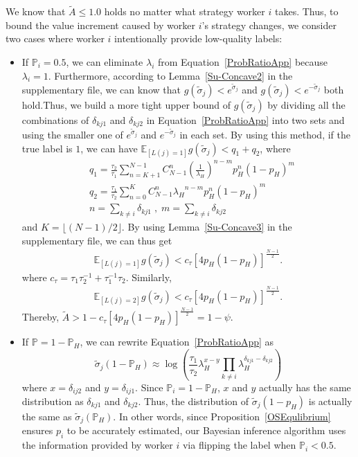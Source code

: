 We know that $\tilde{A}\leq 1.0$ holds no matter what strategy worker $i$ takes. Thus, to bound the value increment caused by worker $i$'s strategy changes, we consider two cases where worker $i$ intentionally provide low-quality labels:
\begin{itemize}
\item If $\mathbb{P}_i=0.5$, we can eliminate $\lambda_i$ from Equation~\ref{ProbRatioApp} because $\lambda_i=1$. Furthermore, according to Lemma~\ref{Su-Concave2} in the supplementary file, we can know that 
$g(\tilde{\sigma}_j)< e^{\tilde{\sigma}_j}$ and $g(\tilde{\sigma}_j)< e^{-\tilde{\sigma}_j}$ both hold.Thus, we build a more tight upper bound of $g(\tilde{\sigma}_j)$ by dividing all the combinations of $\delta_{kj1}$ and $\delta_{kj2}$ in Equation~\ref{ProbRatioApp} into two sets and using the smaller one of $e^{\tilde{\sigma}_j}$ and $e^{-\tilde{\sigma}_j}$ in each set.
By using this method, if the true label is $1$, we can have $\mathbb{E}_{[L(j)=1]}g(\tilde{\sigma}_j)< q_1+q_2$, where
\begin{equation*}
\begin{split}
&q_1 = \frac{\tau_2}{\tau_1}{\sum}_{n=K+1}^{N-1}C_{N-1}^{n} (\frac{1}{\lambda_H})^{n-m}p_H^n(1-p_H)^m\\
&q_2 = \frac{\tau_1}{\tau_2}{\sum}_{n=0}^{K}C_{N-1}^{n} {\lambda_H}^{n-m}p_H^n(1-p_H)^m\\
&n={\sum}_{k\neq i}\delta_{kj1}\;,\;m= {\sum}_{k\neq i}\delta_{kj2}
\end{split}
\end{equation*}
and $K=\lfloor (N-1)/2 \rfloor$. By using Lemma~\ref{Su-Concave3} in the supplementary file, we can thus get
\begin{equation*}
\begin{split}
\mathbb{E}_{[L(j)=1]}g(\tilde{\sigma}_j) < c_{\tau}[4p_H(1-p_H)]^{\frac{N-1}{2}}.
\end{split}
\end{equation*}
where $c_{\tau}=\tau_1\tau_2^{-1}+\tau_1^{-1}\tau_2$. Similarly,
\begin{equation*}
\begin{split}
\mathbb{E}_{[L(j)=2]}g(\tilde{\sigma}_j) < c_{\tau}[4p_H(1-p_H)]^{\frac{N-1}{2}}.
\end{split}
\end{equation*}
Thereby, $\tilde{A}>1-c_{\tau}[4p_H(1-p_H)]^{\frac{N-1}{2}}=1-\psi$.
\item If $\mathbb{P}=1-\mathbb{P}_H$, we can rewrite Equation~\ref{ProbRatioApp} as
\begin{equation*}
\tilde{\sigma}_j(1-\mathbb{P}_H)\approx \log\left(\frac{\tau_{1}}{\tau_{2}}\lambda_H^{x-y}{\prod}_{k\neq i}\lambda_H^{\delta_{kj1}-\delta_{kj2}}\right)
\end{equation*}
where $x=\delta_{ij2}$ and $y=\delta_{ij1}$. Since $\mathbb{P}_i=1-\mathbb{P}_H$, $x$ and $y$ actually has the same distribution as $\delta_{kj1}$ and $\delta_{kj2}$. Thus, the distribution of $\tilde{\sigma}_j(1-p_H)$ is actually the same as $\tilde{\sigma}_j(\mathbb{P}_H)$.
In other words, since Proposition~\ref{OSEqulibrium} ensures $p_i$ to be accurately estimated, our Bayesian inference algorithm uses the information provided by worker $i$ via flipping the label when $\mathbb{P}_i<0.5$.
\end{itemize}
